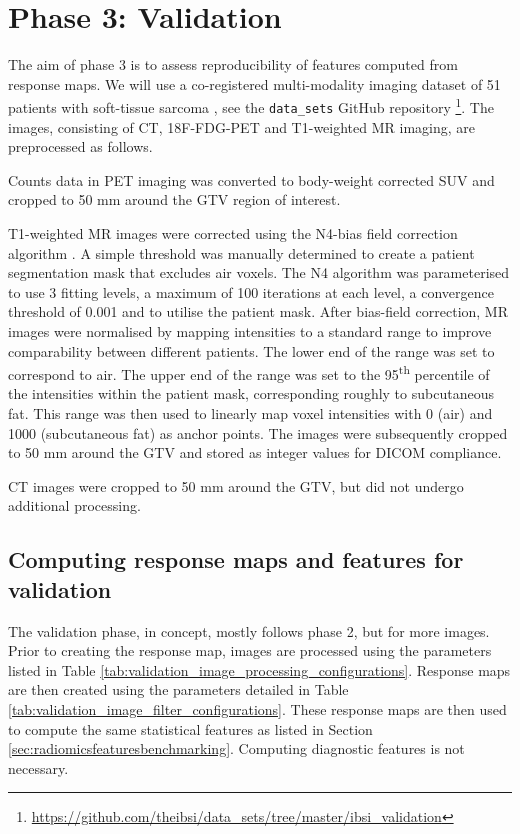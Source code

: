 \documentclass[fleqn,a4paper,oneside,openany]{book}
\begin{document}
\section{Phase 3: Validation}\label{sec:validationPhase}
The aim of phase 3 is to assess reproducibility of features computed from response maps. We will use a co-registered multi-modality imaging dataset of 51 patients with soft-tissue sarcoma \cite{Vallieres2015-hv,Vallieres2015-tf}, see the \texttt{data\_sets} GitHub repository \footnote{\url{https://github.com/theibsi/data_sets/tree/master/ibsi_validation}}. The images, consisting of CT, 18F-FDG-PET and T1-weighted MR imaging, are preprocessed as follows.

Counts data in PET imaging was converted to body-weight corrected SUV and cropped to 50 mm around the GTV region of interest.

T1-weighted MR images were corrected using the N4-bias field correction algorithm \cite{Tustison2010-zb}. A simple threshold was manually determined to create a patient segmentation mask that excludes air voxels. The N4 algorithm was parameterised to use 3 fitting levels, a maximum of 100 iterations at each level, a convergence threshold of 0.001 and to utilise the patient mask. After bias-field correction, MR images were normalised by mapping intensities to a standard range to improve comparability between different patients. The lower end of the range was set to correspond to air. The upper end of the range was set to the 95\textsuperscript{th} percentile of the intensities within the patient mask, corresponding roughly to subcutaneous fat. This range was then used to linearly map voxel intensities with 0 (air) and 1000 (subcutaneous fat) as anchor points. The images were subsequently cropped to 50 mm around the GTV and stored as integer values for DICOM compliance.

CT images were cropped to 50 mm around the GTV, but did not undergo additional processing.

\subsection{Computing response maps and features for validation}

The validation phase, in concept, mostly follows phase 2, but for more images. Prior to creating the response map, images are processed using the parameters listed in Table \ref{tab:validation_image_processing_configurations}. Response maps are then created using the parameters detailed in Table \ref{tab:validation_image_filter_configurations}. These response maps are then used to compute the same statistical features as listed in Section \ref{sec:radiomicsfeaturesbenchmarking}. Computing diagnostic features is not necessary.
\end{document}
